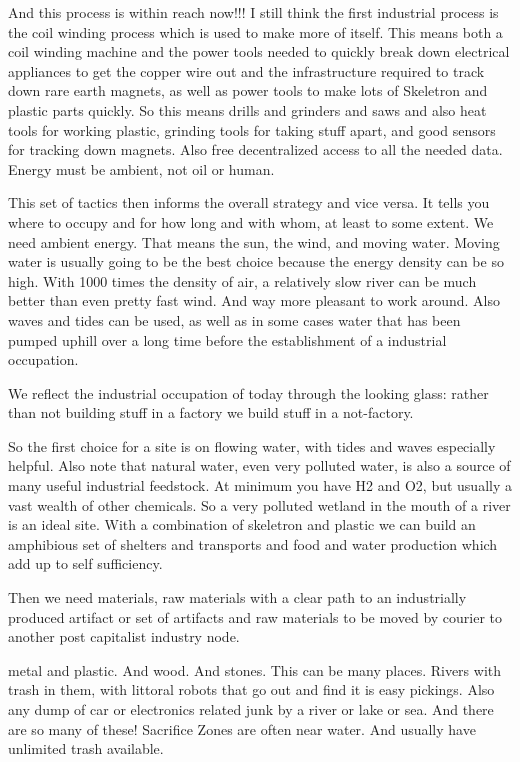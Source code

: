 And this process is within reach now!!! I still think the first
industrial process is the coil winding process which is used to make
more of itself. This means both a coil winding machine and the power
tools needed to quickly break down electrical appliances to get the
copper wire out and the infrastructure required to track down rare earth
magnets, as well as power tools to make lots of Skeletron and plastic
parts quickly. So this means drills and grinders and saws and also heat
tools for working plastic, grinding tools for taking stuff apart, and
good sensors for tracking down magnets. Also free decentralized access
to all the needed data. Energy must be ambient, not oil or human.

This set of tactics then informs the overall strategy and vice versa. It
tells you where to occupy and for how long and with whom, at least to
some extent. We need ambient energy. That means the sun, the wind, and
moving water. Moving water is usually going to be the best choice
because the energy density can be so high. With 1000 times the density
of air, a relatively slow river can be much better than even pretty fast
wind. And way more pleasant to work around. Also waves and tides can be
used, as well as in some cases water that has been pumped uphill over a
long time before the establishment of a industrial occupation.

We reflect the industrial occupation of today through the looking glass:
rather than not building stuff in a factory we build stuff in a
not-factory.

So the first choice for a site is on flowing water, with tides and waves
especially helpful. Also note that natural water, even very polluted
water, is also a source of many useful industrial feedstock. At minimum
you have H2 and O2, but usually a vast wealth of other chemicals. So a
very polluted wetland in the mouth of a river is an ideal site. With a
combination of skeletron and plastic we can build an amphibious set of
shelters and transports and food and water production which add up to
self sufficiency.

Then we need materials, raw materials with a clear path to an
industrially produced artifact or set of artifacts and raw materials to
be moved by courier to another post capitalist industry node.

metal and plastic. And wood. And stones. This can be many places. Rivers
with trash in them, with littoral robots that go out and find it is easy
pickings. Also any dump of car or electronics related junk by a river or
lake or sea. And there are so many of these! Sacrifice Zones are often
near water. And usually have unlimited trash available.

